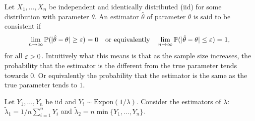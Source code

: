 Let $X_1,\dots,X_n$ be independent and identically distributed (iid) for some distribution with parameter $\theta$. An estimator
$\hat{\theta}$ of parameter $\theta$ is said to be consistent if \[\lim_{n\to\infty}{\mathbb P}(|\hat{\theta}-\theta|\geq
{\varepsilon})=0\quad\text{or equivalently}\quad \lim_{n\to\infty}{\mathbb P}(|\hat{\theta}-\theta|\leq {\varepsilon})=1,\] for all ${\varepsilon}>0$. Intuitively what
this means is that as the sample size increases, the probability that the estimator is the different from the true parameter tends
towards $0$. Or equivalently the probability that the estimator is the same as the true parameter tends to $1$.

Let $Y_1,\dots,Y_n$ be iid and $Y_i\sim\text{Expon}\left(1/\lambda\right)$. Consider the estimators of $\lambda$: $\tilde{\lambda}_1=1/n\sum_{i=1}^n Y_i$
and $\tilde{\lambda}_2=n\min\{Y_1,\dots,Y_n\}$. 